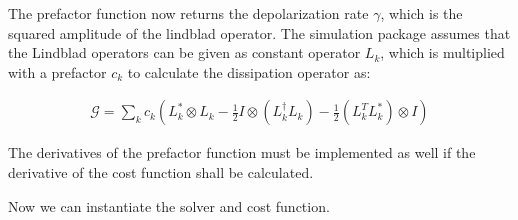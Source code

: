 \documentclass[letterpaper,10pt,english]{sphinxmanual}
\begin{document}
The prefactor function now returns the depolarization rate \(\gamma\), which is the squared amplitude of the lindblad operator. The simulation package assumes that the Lindblad operators can be given as constant operator \(L_k\), which is multiplied with a prefactor \(c_k\) to calculate the dissipation operator as:

\begin{align}
\mathcal{G} = \sum_k c_k (L_k^\ast \otimes L_k
- \frac{1}{2} I \otimes (L_k^\dagger L_k)
- \frac{1}{2} ( L_k^T L_k^\ast ) \otimes I)
\end{align}

The derivatives of the prefactor function must be implemented as well if the derivative of the cost function shall be calculated.

Now we can instantiate the solver and cost function.
\end{document}

